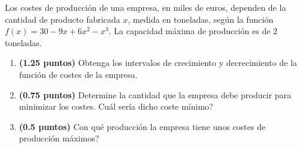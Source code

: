 
Los costes de producción de una empresa, en miles de euros, dependen de la cantidad de producto fabricada $x$, medida en toneladas, según la función $f(x)=30-9x+6x^2-x^3$. La capacidad máxima de producción es de 2 toneladas.
\begin{enumerate}[label=\alph*)]
\item \textbf{(1.25 puntos)} Obtenga los intervalos de crecimiento y decrecimiento de la función de costes de la empresa.
\item \textbf{(0.75 puntos)} Determine la cantidad que la empresa debe producir para minimizar los costes. \textquestiondown{}Cuál sería dicho coste mínimo?
\item \textbf{(0.5 puntos)} \textquestiondown{}Con qué producción la empresa tiene unos costes de producción máximos?
\end{enumerate}
